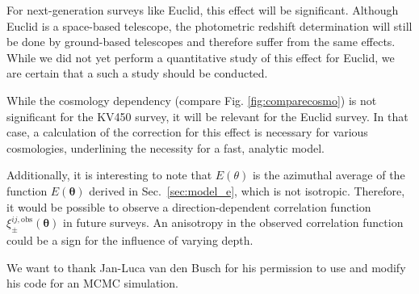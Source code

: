 \documentclass[referee]{aa} %
\renewcommand{\[}{\begin{equation}}
\renewcommand{\]}{\end{equation}}
\renewcommand{\rm}{\mathrm}
\def\b#1{\bm{#1}}
\begin{document}
For next-generation surveys like Euclid, this effect will be significant. Although Euclid is a space-based telescope, the photometric redshift determination will still be done by ground-based telescopes and therefore suffer from the same effects. While we did not yet perform a quantitative study of this effect for Euclid, we are certain that a such a study should be conducted.

While the cosmology dependency (compare Fig. \ref{fig:comparecosmo}) is not significant for the KV450 survey, it will be relevant for the Euclid survey. In that case, a calculation of the correction for this effect is necessary for various cosmologies, underlining the necessity for a fast, analytic model. 

Additionally, it is interesting to note that $E(\theta)$ is the azimuthal average of the function $E(\b\theta)$ derived in Sec.~\ref{sec:model_e}, which is not isotropic. Therefore, it would be possible to observe a direction-dependent correlation function $\xi_\pm^{ij,\rm{obs}}(\b\theta)$ in future surveys. An anisotropy in the observed correlation function could be a sign for the influence of varying depth.



\begin{acknowledgements}
We want to thank Jan-Luca van den Busch for his permission to use and modify his code for an MCMC simulation.\end{acknowledgements}
\end{document}
